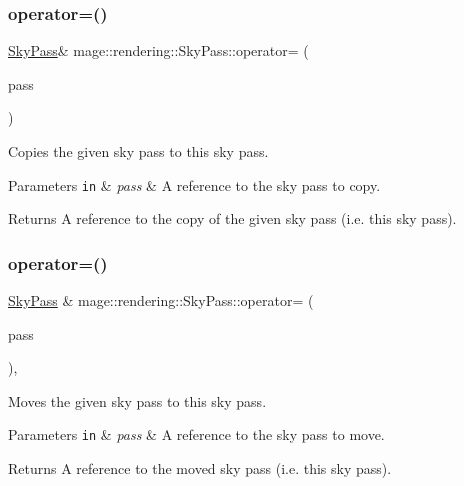 \subsubsection{\texorpdfstring{operator=()}{operator=()}\hspace{0.1cm}{\footnotesize\ttfamily [1/2]}}
{\footnotesize\ttfamily \hyperlink{classmage_1_1rendering_1_1_sky_pass}{Sky\+Pass}\& mage\+::rendering\+::\+Sky\+Pass\+::operator= (\begin{DoxyParamCaption}\item[{const \hyperlink{classmage_1_1rendering_1_1_sky_pass}{Sky\+Pass} \&}]{pass }\end{DoxyParamCaption})\hspace{0.3cm}{\ttfamily [delete]}}

Copies the given sky pass to this sky pass.


\begin{DoxyParams}[1]{Parameters}
\mbox{\tt in}  & {\em pass} & A reference to the sky pass to copy. \\
\hline
\end{DoxyParams}
\begin{DoxyReturn}{Returns}
A reference to the copy of the given sky pass (i.\+e. this sky pass). 
\end{DoxyReturn}
\hypertarget{classmage_1_1rendering_1_1_sky_pass_ad844a754a13fa90ef87aa62745ea936d}{}\label{classmage_1_1rendering_1_1_sky_pass_ad844a754a13fa90ef87aa62745ea936d} 
\subsubsection{\texorpdfstring{operator=()}{operator=()}\hspace{0.1cm}{\footnotesize\ttfamily [2/2]}}
{\footnotesize\ttfamily \hyperlink{classmage_1_1rendering_1_1_sky_pass}{Sky\+Pass} \& mage\+::rendering\+::\+Sky\+Pass\+::operator= (\begin{DoxyParamCaption}\item[{\hyperlink{classmage_1_1rendering_1_1_sky_pass}{Sky\+Pass} \&\&}]{pass }\end{DoxyParamCaption})\hspace{0.3cm}{\ttfamily [default]}, {\ttfamily [noexcept]}}

Moves the given sky pass to this sky pass.


\begin{DoxyParams}[1]{Parameters}
\mbox{\tt in}  & {\em pass} & A reference to the sky pass to move. \\
\hline
\end{DoxyParams}
\begin{DoxyReturn}{Returns}
A reference to the moved sky pass (i.\+e. this sky pass). 
\end{DoxyReturn}
\hypertarget{classmage_1_1rendering_1_1_sky_pass_a94b9ca7b1a02b6f6730584ec80adb84a}{}\label{classmage_1_1rendering_1_1_sky_pass_a94b9ca7b1a02b6f6730584ec80adb84a} 
